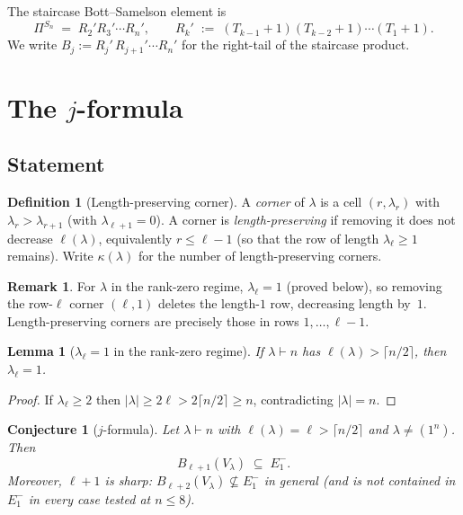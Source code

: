 \documentclass[11pt]{article}
\newtheorem{lemma}[theorem]{Lemma}
\newtheorem{conjecture}[theorem]{Conjecture}
\theoremstyle{definition}
\newtheorem{definition}[theorem]{Definition}
\newtheorem{remark}[theorem]{Remark}
\begin{document}
The staircase Bott--Samelson element is
\[
   \Pi^{S_n} \;=\; R_2' R_3' \cdots R_n',
   \qquad
   R_k' \;:=\; (T_{k-1}{+}1)(T_{k-2}{+}1)\cdots(T_1{+}1).
\]
We write $B_j := R_j'\,R_{j+1}'\cdots R_n'$ for the right-tail of the
staircase product.

\section{The $j$-formula}

\subsection{Statement}

\begin{definition}[Length-preserving corner]
A \emph{corner} of $\lambda$ is a cell $(r,\lambda_r)$ with
$\lambda_r>\lambda_{r+1}$ (with $\lambda_{\ell+1}=0$).  A corner is
\emph{length-preserving} if removing it does not decrease
$\ell(\lambda)$, equivalently $r\le\ell-1$ (so that the row of length
$\lambda_\ell\ge 1$ remains).  Write $\kappa(\lambda)$ for the number
of length-preserving corners.
\end{definition}

\begin{remark}
For $\lambda$ in the rank-zero regime, $\lambda_\ell=1$ (proved
below), so removing the row-$\ell$ corner $(\ell,1)$ deletes the
length-$1$ row, decreasing length by~$1$.  Length-preserving corners
are precisely those in rows $1,\ldots,\ell-1$.
\end{remark}

\begin{lemma}[$\lambda_\ell=1$ in the rank-zero regime]\label{lem:tail-one}
If $\lambda\vdash n$ has $\ell(\lambda)>\lceil n/2\rceil$, then
$\lambda_\ell=1$.
\end{lemma}
\begin{proof}
If $\lambda_\ell\ge 2$ then $|\lambda|\ge 2\ell > 2\lceil n/2\rceil
\ge n$, contradicting $|\lambda|=n$.
\end{proof}

\begin{conjecture}[$j$-formula]\label{conj:j-formula}
Let $\lambda\vdash n$ with $\ell(\lambda)=\ell>\lceil n/2\rceil$ and
$\lambda\ne(1^n)$.  Then
\begin{equation}\label{eq:j-formula}
   B_{\ell+1}(V_\lambda) \;\subseteq\; E_1^-.
\end{equation}
Moreover, $\ell+1$ is sharp: $B_{\ell+2}(V_\lambda)\not\subseteq E_1^-$
in general (and is not contained in $E_1^-$ in every case tested at
$n\le 8$).
\end{conjecture}
\end{document}
